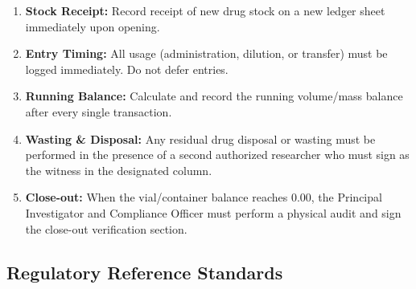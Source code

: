 \begin{instructionbox}
\begin{enumerate}
  \item \textbf{Stock Receipt:} Record receipt of new drug stock on a new ledger sheet immediately upon opening.
  \item \textbf{Entry Timing:} All usage (administration, dilution, or transfer) must be logged immediately. Do not defer entries.
  \item \textbf{Running Balance:} Calculate and record the running volume/mass balance after every single transaction.
  \item \textbf{Wasting \& Disposal:} Any residual drug disposal or wasting must be performed in the presence of a second authorized researcher who must sign as the witness in the designated column.
  \item \textbf{Close-out:} When the vial/container balance reaches 0.00, the Principal Investigator and Compliance Officer must perform a physical audit and sign the close-out verification section.
\end{enumerate}
\end{instructionbox}

\vspace{10pt}
\subsection*{\color{brandnavy}Regulatory Reference Standards}
\nocite{*}


